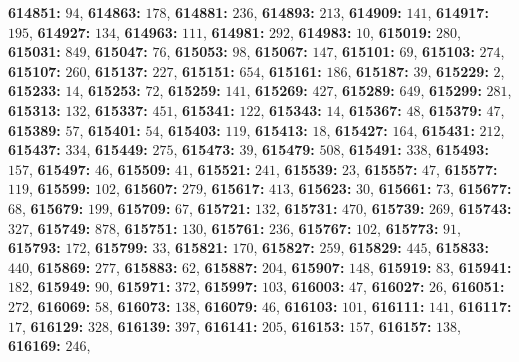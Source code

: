 \textsf{\bfseries 614851:} $94$, \textsf{\bfseries 614863:} $178$, \textsf{\bfseries 614881:} $236$, \textsf{\bfseries 614893:} $213$, \textsf{\bfseries 614909:} $141$, \textsf{\bfseries 614917:} $195$, \textsf{\bfseries 614927:} $134$, \textsf{\bfseries 614963:} $111$, \textsf{\bfseries 614981:} $292$, \textsf{\bfseries 614983:} $10$, \textsf{\bfseries 615019:} $280$, \textsf{\bfseries 615031:} $849$, \textsf{\bfseries 615047:} $76$, \textsf{\bfseries 615053:} $98$, \textsf{\bfseries 615067:} $147$, \textsf{\bfseries 615101:} $69$, \textsf{\bfseries 615103:} $274$, \textsf{\bfseries 615107:} $260$, \textsf{\bfseries 615137:} $227$, \textsf{\bfseries 615151:} $654$, \textsf{\bfseries 615161:} $186$, \textsf{\bfseries 615187:} $39$, \textsf{\bfseries 615229:} $2$, \textsf{\bfseries 615233:} $14$, \textsf{\bfseries 615253:} $72$, \textsf{\bfseries 615259:} $141$, \textsf{\bfseries 615269:} $427$, \textsf{\bfseries 615289:} $649$, \textsf{\bfseries 615299:} $281$, \textsf{\bfseries 615313:} $132$, \textsf{\bfseries 615337:} $451$, \textsf{\bfseries 615341:} $122$, \textsf{\bfseries 615343:} $14$, \textsf{\bfseries 615367:} $48$, \textsf{\bfseries 615379:} $47$, \textsf{\bfseries 615389:} $57$, \textsf{\bfseries 615401:} $54$, \textsf{\bfseries 615403:} $119$, \textsf{\bfseries 615413:} $18$, \textsf{\bfseries 615427:} $164$, \textsf{\bfseries 615431:} $212$, \textsf{\bfseries 615437:} $334$, \textsf{\bfseries 615449:} $275$, \textsf{\bfseries 615473:} $39$, \textsf{\bfseries 615479:} $508$, \textsf{\bfseries 615491:} $338$, \textsf{\bfseries 615493:} $157$, \textsf{\bfseries 615497:} $46$, \textsf{\bfseries 615509:} $41$, \textsf{\bfseries 615521:} $241$, \textsf{\bfseries 615539:} $23$, \textsf{\bfseries 615557:} $47$, \textsf{\bfseries 615577:} $119$, \textsf{\bfseries 615599:} $102$, \textsf{\bfseries 615607:} $279$, \textsf{\bfseries 615617:} $413$, \textsf{\bfseries 615623:} $30$, \textsf{\bfseries 615661:} $73$, \textsf{\bfseries 615677:} $68$, \textsf{\bfseries 615679:} $199$, \textsf{\bfseries 615709:} $67$, \textsf{\bfseries 615721:} $132$, \textsf{\bfseries 615731:} $470$, \textsf{\bfseries 615739:} $269$, \textsf{\bfseries 615743:} $327$, \textsf{\bfseries 615749:} $878$, \textsf{\bfseries 615751:} $130$, \textsf{\bfseries 615761:} $236$, \textsf{\bfseries 615767:} $102$, \textsf{\bfseries 615773:} $91$, \textsf{\bfseries 615793:} $172$, \textsf{\bfseries 615799:} $33$, \textsf{\bfseries 615821:} $170$, \textsf{\bfseries 615827:} $259$, \textsf{\bfseries 615829:} $445$, \textsf{\bfseries 615833:} $440$, \textsf{\bfseries 615869:} $277$, \textsf{\bfseries 615883:} $62$, \textsf{\bfseries 615887:} $204$, \textsf{\bfseries 615907:} $148$, \textsf{\bfseries 615919:} $83$, \textsf{\bfseries 615941:} $182$, \textsf{\bfseries 615949:} $90$, \textsf{\bfseries 615971:} $372$, \textsf{\bfseries 615997:} $103$, \textsf{\bfseries 616003:} $47$, \textsf{\bfseries 616027:} $26$, \textsf{\bfseries 616051:} $272$, \textsf{\bfseries 616069:} $58$, \textsf{\bfseries 616073:} $138$, \textsf{\bfseries 616079:} $46$, \textsf{\bfseries 616103:} $101$, \textsf{\bfseries 616111:} $141$, \textsf{\bfseries 616117:} $17$, \textsf{\bfseries 616129:} $328$, \textsf{\bfseries 616139:} $397$, \textsf{\bfseries 616141:} $205$, \textsf{\bfseries 616153:} $157$, \textsf{\bfseries 616157:} $138$, \textsf{\bfseries 616169:} $246$, 
